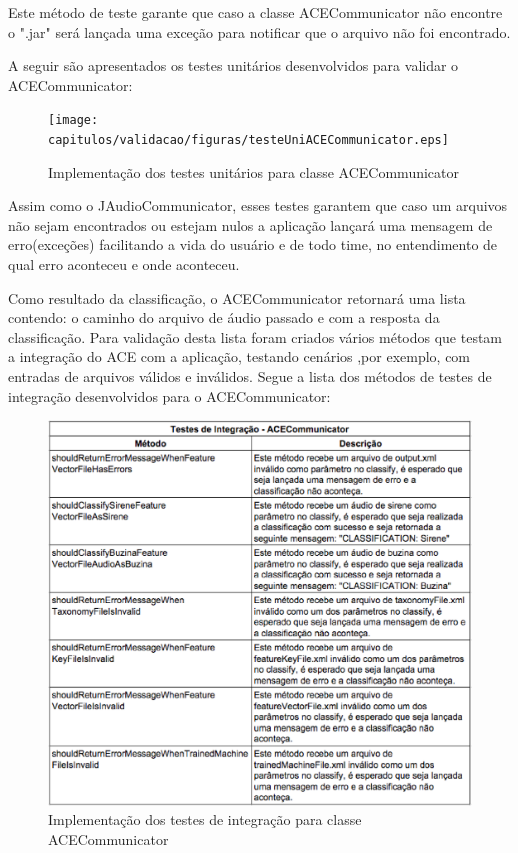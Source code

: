 \begin{itemize}
Este método de teste garante que caso a classe ACECommunicator não encontre o ".jar" será lançada uma exceção para notificar que o arquivo não foi encontrado.

A seguir são apresentados os testes unitários desenvolvidos para validar o ACECommunicator:

\begin{figure}[H]
	\centering
	\captionsetup{justification=centering,margin=2cm}
	\texttt{[image: capitulos/validacao/figuras/testeUniACECommunicator.eps]}
	\caption{Implementação dos testes unitários para classe ACECommunicator}
	\label{fig:result-engajamento}
\end{figure}

Assim como o JAudioCommunicator, esses testes garantem que caso um  arquivos não sejam encontrados ou estejam nulos a aplicação lançará uma mensagem de erro(exceções) facilitando a vida do usuário e de todo time, no entendimento de qual erro aconteceu e onde aconteceu.

Como resultado da classificação, o ACECommunicator retornará uma lista contendo: o caminho do arquivo de áudio passado e com a resposta da classificação. Para validação desta lista foram criados vários métodos que testam a integração do ACE com a aplicação, testando cenários ,por exemplo, com entradas de arquivos válidos e inválidos. Segue a lista dos métodos de testes de integração desenvolvidos para o ACECommunicator:

\begin{figure}[H]
	\centering
	\captionsetup{justification=centering,margin=2cm}
	\includegraphics[scale=0.65]{capitulos/validacao/figuras/testesIntegracaoACECommunicator.eps}
	\caption{Implementação dos testes de integração para classe ACECommunicator}
	\label{fig:result-engajamento}
\end{figure}


\end{itemize}
